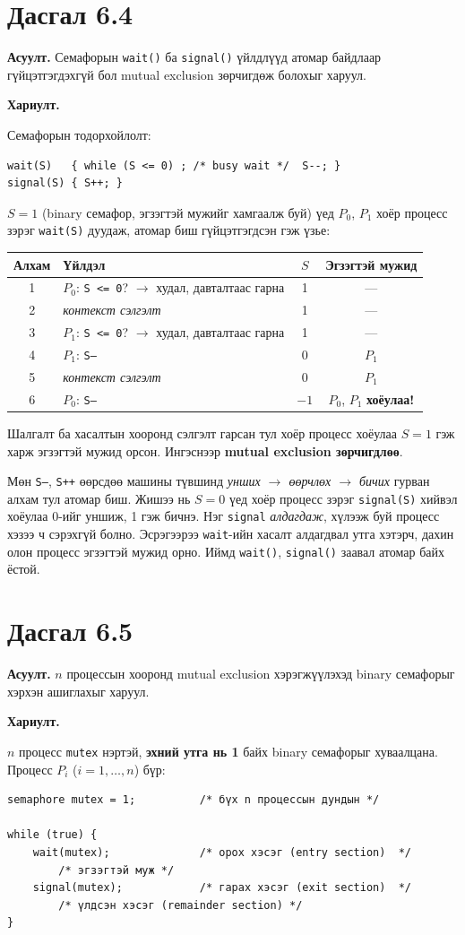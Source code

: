 \documentclass[12pt,a4paper]{article}
\newcommand{\question}[2]{\section{Дасгал #1}\textbf{Асуулт.} #2\par\medskip\textbf{Хариулт.}\par}
\begin{document}
\question{6.4}{Семафорын \texttt{wait()} ба \texttt{signal()} үйлдлүүд атомар байдлаар гүйцэтгэгдэхгүй бол mutual exclusion зөрчигдөж болохыг харуул.}

Семафорын тодорхойлолт:
\begin{lstlisting}
wait(S)   { while (S <= 0) ; /* busy wait */  S--; }
signal(S) { S++; }
\end{lstlisting}

$S = 1$ (binary семафор, эгзэгтэй мужийг хамгаалж буй) үед $P_0$, $P_1$ хоёр процесс зэрэг \texttt{wait(S)} дуудаж, атомар биш гүйцэтгэгдсэн гэж үзье:

\begin{center}
\begin{tabular}{clcc}\toprule
Алхам & Үйлдэл & $S$ & Эгзэгтэй мужид\\\midrule
1 & $P_0$: \texttt{S <= 0}? $\to$ худал, давталтаас гарна & 1 & —\\
2 & \textit{контекст сэлгэлт} & 1 & —\\
3 & $P_1$: \texttt{S <= 0}? $\to$ худал, давталтаас гарна & 1 & —\\
4 & $P_1$: \texttt{S--} & 0 & $P_1$\\
5 & \textit{контекст сэлгэлт} & 0 & $P_1$\\
6 & $P_0$: \texttt{S--} & $-1$ & $P_0$, $P_1$ \textbf{хоёулаа!}\\\bottomrule
\end{tabular}
\end{center}

Шалгалт ба хасалтын хооронд сэлгэлт гарсан тул хоёр процесс хоёулаа $S = 1$ гэж харж эгзэгтэй мужид орсон. Ингэснээр \textbf{mutual exclusion зөрчигдлөө}.

Мөн \texttt{S--}, \texttt{S++} өөрсдөө машины түвшинд \emph{унших $\to$ өөрчлөх $\to$ бичих} гурван алхам тул атомар биш. Жишээ нь $S = 0$ үед хоёр процесс зэрэг \texttt{signal(S)} хийвэл хоёулаа 0-ийг уншиж, 1 гэж бичнэ. Нэг \texttt{signal} \emph{алдагдаж}, хүлээж буй процесс хэзээ ч сэрэхгүй болно. Эсрэгээрээ \texttt{wait}-ийн хасалт алдагдвал утга хэтэрч, дахин олон процесс эгзэгтэй мужид орно. Иймд \texttt{wait()}, \texttt{signal()} заавал атомар байх ёстой.

\question{6.5}{$n$ процессын хооронд mutual exclusion хэрэгжүүлэхэд binary семафорыг хэрхэн ашиглахыг харуул.}

$n$ процесс \texttt{mutex} нэртэй, \textbf{эхний утга нь 1} байх binary семафорыг хуваалцана. Процесс $P_i$ ($i = 1, \dots, n$) бүр:
\begin{lstlisting}
semaphore mutex = 1;          /* бүх n процессын дундын */

while (true) {
    wait(mutex);              /* орох хэсэг (entry section)  */
        /* эгзэгтэй муж */
    signal(mutex);            /* гарах хэсэг (exit section)  */
        /* үлдсэн хэсэг (remainder section) */
}
\end{lstlisting}
\end{document}

